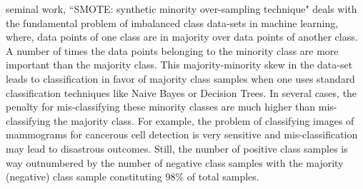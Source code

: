 \documentclass[10pt,journal,compsoc]{IEEEtran}
\begin{document}




% 
% 
% 
% 
 seminal work, ``SMOTE: synthetic minority over-sampling technique"\cite{smote} deals with the fundamental  problem of imbalanced class data-sets in machine learning, where, data points of one class are in majority over data points of another class. A number of times the data points belonging to the minority class are more important than the majority class. This majority-minority skew in the data-set leads to classification in favor of majority class samples when one uses standard classification techniques like Naive Bayes or Decision Trees. In several cases, the penalty for mis-classifying these minority classes are much higher than mis-classifying the majority class. For example, the problem of classifying images of mammograms for cancerous cell detection is very sensitive and mis-classification may lead to disastrous outcomes. Still, the number of positive class samples is way outnumbered by the number of negative class samples with the majority (negative) class sample constituting 98\% of total samples.
\end{document}
